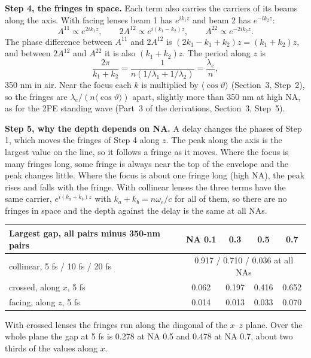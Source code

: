 \documentclass[11pt]{article}
\begin{document}
\textbf{Step 4, the fringes in space.} Each term also carries the carriers of its beams along the axis. With
facing lenses beam 1 has $e^{ik_1z}$ and beam 2 has $e^{-ik_2z}$:
\begin{equation}A^{11} \propto e^{2ik_1z},\qquad 2A^{12} \propto e^{i(k_1-k_2)z},\qquad A^{22} \propto e^{-2ik_2z} .\end{equation}
The phase difference between $A^{11}$ and $2A^{12}$ is $(2k_1 - k_1 + k_2)z = (k_1+k_2)z$, and between $2A^{12}$
and $A^{22}$ it is also $(k_1+k_2)z$. The period along $z$ is
\begin{equation}\frac{2\pi}{k_1 + k_2} = \frac{1}{n(1/\lambda_1 + 1/\lambda_2)} = \frac{\lambda_e}{n} ,\end{equation}
350 nm in air. Near the focus each $k$ is multiplied by $\langle\cos\vartheta\rangle$ (Section~3, Step~2), so the fringes
are $\lambda_e/(n\langle\cos\vartheta\rangle)$ apart, slightly more than 350 nm at high NA, as for the 2PE standing wave
(Part~3 of the derivations, Section~3, Step~5).

\textbf{Step 5, why the depth depends on NA.} A delay changes the phases of Step 1, which moves the fringes of
Step 4 along $z$. The peak along the axis is the largest value on the line, so it follows a fringe as it moves.
Where the focus is many fringes long, some fringe is always near the top of the envelope and the peak changes
little. Where the focus is about one fringe long (high NA), the peak rises and falls with the fringe. With
collinear lenses the three terms have the same carrier, $e^{i(k_a+k_b)z}$ with $k_a + k_b = n\omega_e/c$ for all of
them, so there are no fringes in space and the depth against the delay is the same at all NAs.
\begin{center}\small\begin{tabular}{lcccc}\toprule
Largest gap, all pairs minus 350-nm pairs & NA 0.1 & 0.3 & 0.5 & 0.7\\\midrule
collinear, 5 fs / 10 fs / 20 fs & \multicolumn{4}{c}{0.917 / 0.710 / 0.036 at all NAs}\\
crossed, along $x$, 5 fs & 0.062 & 0.197 & 0.416 & 0.652\\
facing, along $z$, 5 fs & 0.014 & 0.013 & 0.033 & 0.070\\\bottomrule\end{tabular}\end{center}
With crossed lenses the fringes run along the diagonal of the $x$--$z$ plane. Over the whole plane the gap at
5 fs is 0.278 at NA 0.5 and 0.478 at NA 0.7, about two thirds of the values along $x$.
\end{document}
